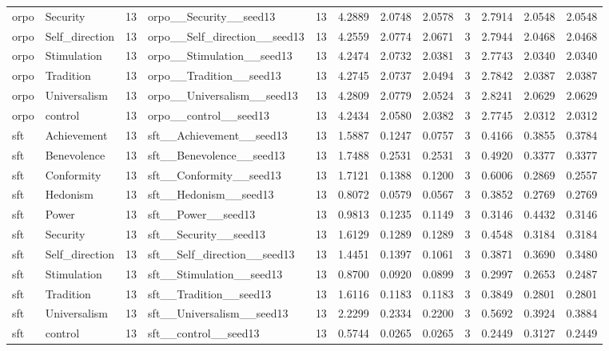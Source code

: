 \begin{tabular}{llrlrrrrrrrr}
orpo & Security & 13 & orpo\_\_Security\_\_seed13 & 13 & 4.2889 & 2.0748 & 2.0578 & 3 & 2.7914 & 2.0548 & 2.0548 \\
orpo & Self\_direction & 13 & orpo\_\_Self\_direction\_\_seed13 & 13 & 4.2559 & 2.0774 & 2.0671 & 3 & 2.7944 & 2.0468 & 2.0468 \\
orpo & Stimulation & 13 & orpo\_\_Stimulation\_\_seed13 & 13 & 4.2474 & 2.0732 & 2.0381 & 3 & 2.7743 & 2.0340 & 2.0340 \\
orpo & Tradition & 13 & orpo\_\_Tradition\_\_seed13 & 13 & 4.2745 & 2.0737 & 2.0494 & 3 & 2.7842 & 2.0387 & 2.0387 \\
orpo & Universalism & 13 & orpo\_\_Universalism\_\_seed13 & 13 & 4.2809 & 2.0779 & 2.0524 & 3 & 2.8241 & 2.0629 & 2.0629 \\
orpo & control & 13 & orpo\_\_control\_\_seed13 & 13 & 4.2434 & 2.0580 & 2.0382 & 3 & 2.7745 & 2.0312 & 2.0312 \\
sft & Achievement & 13 & sft\_\_Achievement\_\_seed13 & 13 & 1.5887 & 0.1247 & 0.0757 & 3 & 0.4166 & 0.3855 & 0.3784 \\
sft & Benevolence & 13 & sft\_\_Benevolence\_\_seed13 & 13 & 1.7488 & 0.2531 & 0.2531 & 3 & 0.4920 & 0.3377 & 0.3377 \\
sft & Conformity & 13 & sft\_\_Conformity\_\_seed13 & 13 & 1.7121 & 0.1388 & 0.1200 & 3 & 0.6006 & 0.2869 & 0.2557 \\
sft & Hedonism & 13 & sft\_\_Hedonism\_\_seed13 & 13 & 0.8072 & 0.0579 & 0.0567 & 3 & 0.3852 & 0.2769 & 0.2769 \\
sft & Power & 13 & sft\_\_Power\_\_seed13 & 13 & 0.9813 & 0.1235 & 0.1149 & 3 & 0.3146 & 0.4432 & 0.3146 \\
sft & Security & 13 & sft\_\_Security\_\_seed13 & 13 & 1.6129 & 0.1289 & 0.1289 & 3 & 0.4548 & 0.3184 & 0.3184 \\
sft & Self\_direction & 13 & sft\_\_Self\_direction\_\_seed13 & 13 & 1.4451 & 0.1397 & 0.1061 & 3 & 0.3871 & 0.3690 & 0.3480 \\
sft & Stimulation & 13 & sft\_\_Stimulation\_\_seed13 & 13 & 0.8700 & 0.0920 & 0.0899 & 3 & 0.2997 & 0.2653 & 0.2487 \\
sft & Tradition & 13 & sft\_\_Tradition\_\_seed13 & 13 & 1.6116 & 0.1183 & 0.1183 & 3 & 0.3849 & 0.2801 & 0.2801 \\
sft & Universalism & 13 & sft\_\_Universalism\_\_seed13 & 13 & 2.2299 & 0.2334 & 0.2200 & 3 & 0.5692 & 0.3924 & 0.3884 \\
sft & control & 13 & sft\_\_control\_\_seed13 & 13 & 0.5744 & 0.0265 & 0.0265 & 3 & 0.2449 & 0.3127 & 0.2449 \\

\end{tabular}
